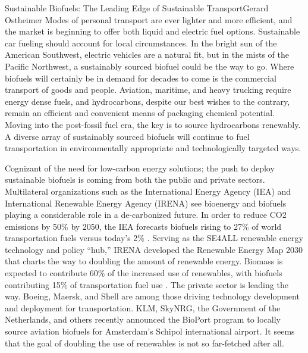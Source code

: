 \documentclass[10pt]{papertex}
\begin{document}
\begin{news}{2}{Sustainable Biofuels: The Leading Edge of Sustainable 
    Transport}{Gerard Ostheimer}{}{}
Modes of personal transport are ever lighter and more efficient, and the 
market is beginning to offer both liquid and electric fuel options. 
Sustainable car fueling should account for local circumstances. In the bright 
sun of the American Southwest, electric vehicles are a natural fit, but in the 
mists of the Pacific Northwest, a sustainably sourced biofuel could be the way 
to go. Where biofuels will certainly be in demand for decades to come is the 
commercial transport of goods and people. Aviation, maritime, and heavy 
trucking require energy dense fuels, and hydrocarbons, despite our best wishes 
to the contrary, remain an efficient and convenient means of packaging chemical 
potential. Moving into the post-fossil fuel era, the key is to source 
hydrocarbons renewably. A diverse array of sustainably sourced biofuels will 
continue to fuel transportation in environmentally appropriate and 
technologically targeted ways.

Cognizant of the need for low-carbon energy solutions; the push to deploy 
sustainable biofuels is coming from both the public and private sectors. 
Multilateral organizations such as the International Energy Agency (IEA) and 
International Renewable Energy Agency (IRENA) see bioenergy and biofuels 
playing a considerable role in a de-carbonized future. In order to reduce CO2 
emissions by 50\% by 2050, the IEA forecasts biofuels rising to 27\% of world 
transportation fuels versus today’s 2\% . Serving as the SE4ALL renewable 
energy technology and policy “hub,” IRENA developed the Renewable Energy Map 
2030 that charts the way to doubling the amount of renewable energy. Biomass 
is expected to contribute 60\% of the increased use of renewables, with 
biofuels contributing 15\% of transportation fuel use . The private sector is 
leading the way. Boeing, Maersk, and Shell are among those driving technology 
development and deployment for transportation. KLM, SkyNRG, the Government of 
the Netherlands, and others recently announced the BioPort program to locally 
source aviation biofuels for Amsterdam’s Schipol international airport. It 
seems that the goal of doubling the use of renewables is not so far-fetched 
after all.


\end{news}
\end{document}
